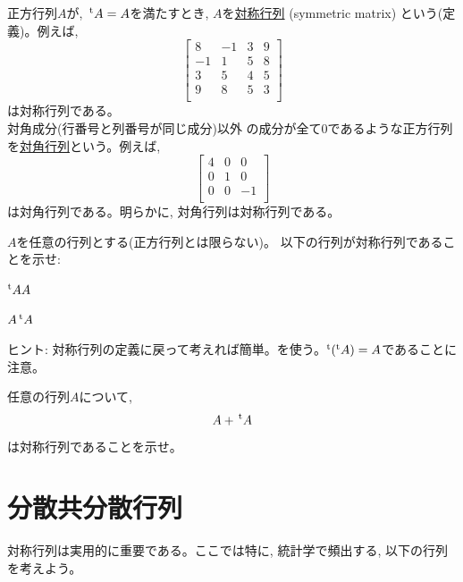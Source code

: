 正方行列$A$が, $\,^{\text t}A=A$を満たすとき, 
$A$を\underline{対称行列} (symmetric matrix)
という(定義)。例えば, 
\begin{equation}
\left[\begin{array}{cccc}
8 & -1 &  3 &  9\\
-1 & 1 &  5 &  8\\
3  & 5 &  4 &  5\\
9  & 8 &  5 &  3\\
\end{array}\right]\label{eq:matrixsample3}
\end{equation}
は対称行列である。\\

対角成分(行番号と列番号が同じ成分)以外
の成分が全て0であるような正方行列を\underline{対角行列}という。例えば, 
\begin{equation}
\left[\begin{array}{cccc}
4 & 0 & 0\\
0 & 1 & 0\\
0 & 0 & -1\\
\end{array}\right]
\end{equation}
は対角行列である。明らかに, 対角行列は対称行列である。

\begin{q}\label{q:matrix_symmetry_exmpl1} $A$を任意の行列とする(正方行列とは限らない)。
以下の行列が対称行列であることを示せ:
\begin{edaenumerate}
\item $^{\text t}AA$
\item $A\,^{\text t}A$
\end{edaenumerate}
ヒント: 対称行列の定義に戻って考えれば簡単。を使う。$^{\text t}(^{\text t} A)=A$であることに注意。
\end{q}
\mv

\begin{q}\label{q:A_tA_2_symmetry} 任意の行列$A$について, 
\begin{eqnarray}A+\,^{\text t}A\end{eqnarray}
は対称行列であることを示せ。\end{q}
\mv

\section{分散共分散行列}

対称行列は実用的に重要である。ここでは特に, 統計学で頻出する, 
以下の行列を考えよう。

